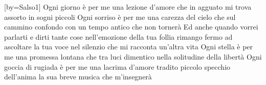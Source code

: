 [by={Salso1}]
\beginverse
Ogni giorno è per me
una lezione d'amore
che in agguato mi trova
assorto in sogni piccoli
Ogni sorriso è per me
una carezza del cielo
che sul cammino confondo
con un tempo antico che non tornerà
\endverse
\beginchorus
Ed anche quando vorrei parlarti e dirti tante cose
nell'emozione della tua follia
rimango fermo ad ascoltare
la tua voce nel silenzio
che mi racconta un'altra vita
\endchorus
\beginverse
Ogni stella è per me
una promessa lontana
che tra luci dimentico
nella solitudine della libertà
Ogni goccia di rugiada è per me
una lacrima d'amore tradito
piccolo specchio dell'anima
la sua breve musica che m'insegnerà
\endverse
\endsong
